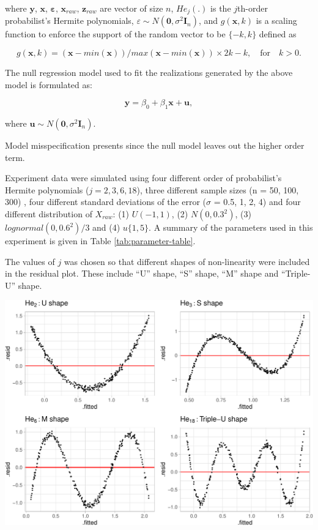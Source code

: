 \documentclass[]{interact}
\theoremstyle{plain}%
\theoremstyle{definition}
\theoremstyle{remark}
\begin{document}
where \(\boldsymbol{y}\), \(\boldsymbol{x}\),
\(\boldsymbol{\varepsilon}\), \(\boldsymbol{x}_{raw}\),
\(\boldsymbol{z}_{raw}\) are vector of size \(n\), \(He_{j}(.)\) is the
\(j\)th-order probabilist's Hermite polynomials,
\(\varepsilon \sim N(\boldsymbol{0}, \sigma^2\boldsymbol{I}_n)\), and
\(g(\boldsymbol{x}, k)\) is a scaling function to enforce the support of
the random vector to be \(\{-k, k\}\) defined as

\begin{equation} \label{eq:scaling-function}
g(\boldsymbol{x}, k) = (\boldsymbol{x} - min(\boldsymbol{x}))/max(\boldsymbol{x} - min(\boldsymbol{x})) \times 2k - k, \quad \text{for} \quad k > 0. 
\end{equation}

The null regression model used to fit the realizations generated by the
above model is formulated as:

\begin{equation} \label{eq:scaling-function}
\boldsymbol{y} = \beta_0 + \beta_1 \boldsymbol{x} + \boldsymbol{u},
\end{equation}

where
\(\boldsymbol{u} \sim N(\boldsymbol{0}, \sigma^2\boldsymbol{I}_n)\).

Model misspecification presents since the null model leaves out the
higher order term.

Experiment data were simulated using four different order of
probabilist's Hermite polynomials (\(j = 2, 3, 6, 18\)), three different
sample sizes (n = 50, 100, 300) , four different standard deviations of
the error (\(\sigma\) = 0.5, 1, 2, 4) and four different distribution of
\(X_{raw}\): (1) \(U(-1, 1)\), (2) \(N(0, 0.3^2)\), (3)
\(lognormal(0, 0.6^2)/3\) and (4) \(u\{1, 5\}\). A summary of the
parameters used in this experiment is given in Table
\ref{tab:parameter-table}.

The values of \(j\) was chosen so that different shapes of non-linearity
were included in the residual plot. These include ``U'' shape, ``S''
shape, ``M'' shape and ``Triple-U'' shape.

\includegraphics[width=1\linewidth]{paper_comparison_files/figure-latex/different-shape-of-herimite-1}
\end{document}
